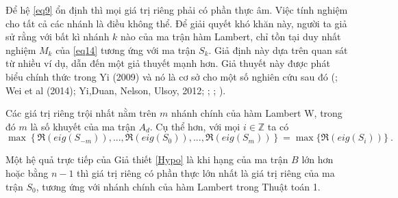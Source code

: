 \noindent Để hệ \eqref{eq9} ổn định thì mọi giá trị riêng phải có phần thực âm. Việc tính nghiệm cho tất cả các nhánh là điều không thể. Để giải quyết khó khăn này, người ta giả sử rằng với bất kì nhánh $k$ nào của ma trận hàm Lambert, chỉ tồn tại duy nhất nghiệm $M_k$ của \eqref{eq14} tương ứng với ma trận $S_k$. Giả định này dựa trên quan sát từ nhiều ví dụ, dẫn đến một giả thuyết mạnh hơn. Giả thuyết này được phát biểu chính thức trong Yi (2009) và nó là cơ sở cho một số nghiên cứu sau đó (\cite{Dua12}; Wei et al (2014); Yi,Duan, Nelson, Ulsoy, 2012; \cite{YiEig10}; \cite{YiJune12}; \cite{YiDes10} ).

\begin{gth}\label{Hypo}
Các giá trị riêng trội nhất nằm trên $m$ nhánh chính của hàm Lambert W, trong đó $m$ là số khuyết của ma trận $A_d$. Cụ thể hơn, với mọi $i \in \mathbb{Z}$ ta có
\begin{equation}\label{hypothesis}
\max\left\{ \Re(eig(S_{-m})), ... , \Re(eig(S_{0})), ... , \Re(eig(S_{m})) \right\} = \max \{ \Re(eig(S_i))\} \ .  
\end{equation}
\end{gth}

Một hệ quả trực tiếp của Giả thiết \ref{Hypo} là khi hạng của ma trận $B$ lớn hơn hoặc bằng $n-1$ thì giá trị riêng có phần thực lớn nhất là giá trị riêng của ma trận $S_0$, tương ứng với nhánh chính của hàm Lambert trong Thuật toán 1.

